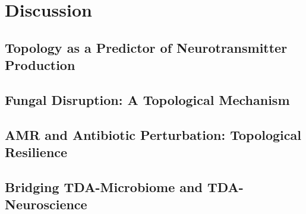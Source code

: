 \section{Discussion}
\label{sec:discussion}


\subsection{Topology as a Predictor of Neurotransmitter Production}

\subsection{Fungal Disruption: A Topological Mechanism}

\subsection{AMR and Antibiotic Perturbation: Topological Resilience}

\subsection{Bridging TDA-Microbiome and TDA-Neuroscience}

